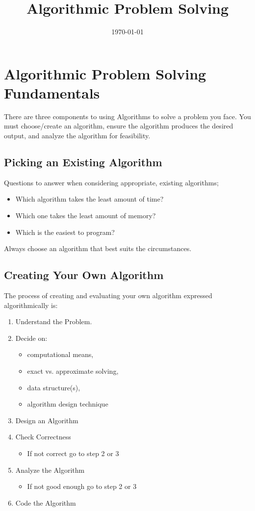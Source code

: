 \documentclass[12pt]{amsart}
\title{Algorithmic Problem Solving}
\date{\today}
\begin{document}
\maketitle
\section{Algorithmic Problem Solving Fundamentals}
There are three components to using Algorithms to solve a problem you face. You must choose/create an algorithm, ensure the algorithm produces the desired output, and analyze the algorithm for feasibility. 
\subsection{Picking an Existing Algorithm}

  Questions to answer when considering appropriate, existing algorithms;
\begin{itemize}
	\item Which algorithm takes the least amount of time?
  	\item Which one takes the least amount of memory?
  	\item Which is the easiest to program?
\end{itemize}
  Always choose an algorithm that best suits the circumstances.
\subsection{Creating Your Own Algorithm}
The process of creating and evaluating your own algorithm expressed algorithmically is:
\begin{enumerate}
	\item Understand the Problem.
	\item Decide on:
	\begin{itemize}
       		\item computational means,
       		\item exact vs. approximate solving,
       		\item data structure(s),
       		\item algorithm design technique
	\end{itemize}
	\item Design an Algorithm
	\item Check Correctness
       		\begin{itemize}
			\item If not correct go to step 2 or 3
		\end{itemize}
	\item Analyze the Algorithm
       		\begin{itemize}
			\item If not good enough go to step 2 or 3
		\end{itemize}
		
	\item Code the Algorithm
\end{enumerate}
\end{document}
